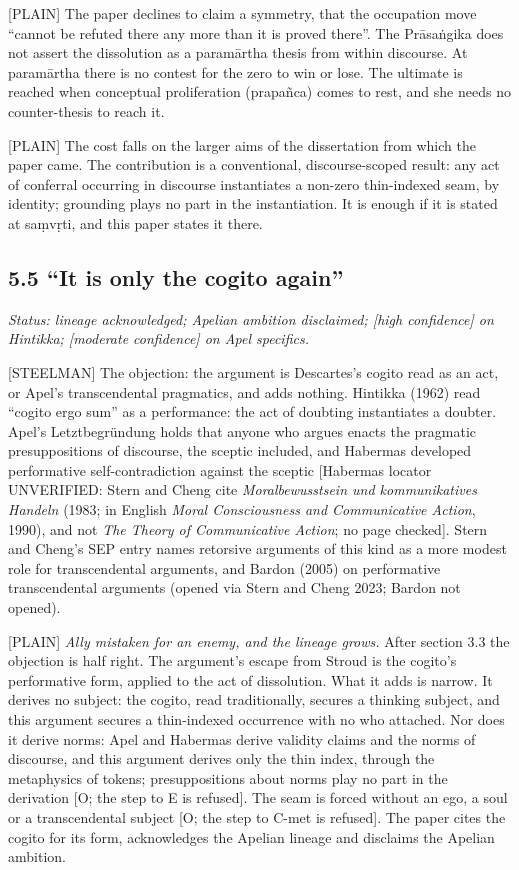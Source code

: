 \documentclass[11pt]{article}
\newcommand{\register}[1]{{\ttfamily\small #1}}
\begin{document}
\register{[PLAIN]} The paper declines to claim a symmetry, that the occupation move ``cannot be refuted there any more than it is proved there''. The Prāsaṅgika does not assert the dissolution as a paramārtha thesis from within discourse. At paramārtha there is no contest for the zero to win or lose. The ultimate is reached when conceptual proliferation (prapañca) comes to rest, and she needs no counter-thesis to reach it.

\register{[PLAIN]} The cost falls on the larger aims of the dissertation from which the paper came. The contribution is a conventional, discourse-scoped result: any act of conferral occurring in discourse instantiates a non-zero thin-indexed seam, by identity; grounding plays no part in the instantiation. It is enough if it is stated at saṃvṛti, and this paper states it there.

\subsection*{5.5 ``It is only the cogito again''}

\emph{Status: lineage acknowledged; Apelian ambition disclaimed; [high confidence] on Hintikka; [moderate confidence] on Apel specifics.}

\register{[STEELMAN]} The objection: the argument is Descartes's cogito read as an act, or Apel's transcendental pragmatics, and adds nothing. Hintikka (1962) read ``cogito ergo sum'' as a performance: the act of doubting instantiates a doubter. Apel's Letztbegründung holds that anyone who argues enacts the pragmatic presuppositions of discourse, the sceptic included, and Habermas developed performative self-contradiction against the sceptic [Habermas locator UNVERIFIED: Stern and Cheng cite \emph{Moralbewusstsein und kommunikatives Handeln} (1983; in English \emph{Moral Consciousness and Communicative Action}, 1990), and not \emph{The Theory of Communicative Action}; no page checked]. Stern and Cheng's SEP entry names retorsive arguments of this kind as a more modest role for transcendental arguments, and Bardon (2005) on performative transcendental arguments (opened via Stern and Cheng 2023; Bardon not opened).

\register{[PLAIN]} \emph{Ally mistaken for an enemy, and the lineage grows.} After section 3.3 the objection is half right. The argument's escape from Stroud is the cogito's performative form, applied to the act of dissolution. What it adds is narrow. It derives no subject: the cogito, read traditionally, secures a thinking subject, and this argument secures a thin-indexed occurrence with no who attached. Nor does it derive norms: Apel and Habermas derive validity claims and the norms of discourse, and this argument derives only the thin index, through the metaphysics of tokens; presuppositions about norms play no part in the derivation [O; the step to E is refused]. The seam is forced without an ego, a soul or a transcendental subject [O; the step to C-met is refused]. The paper cites the cogito for its form, acknowledges the Apelian lineage and disclaims the Apelian ambition.
\end{document}
